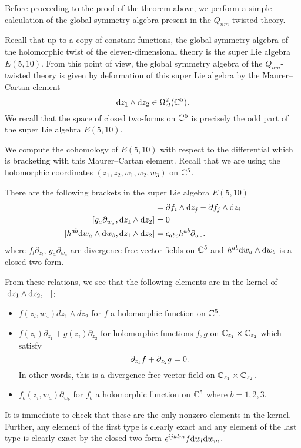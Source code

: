 Before proceeding to the proof of the theorem above, we perform a simple calculation of the global symmetry algebra present in the $Q_{nm}$-twisted theory. 

Recall that up to a copy of constant functions, the global symmetry algebra of the holomorphic twist of the eleven-dimensional theory is the super Lie algebra $E(5,10)$.
From this point of view, the global symmetry algebra of the $Q_{nm}$-twisted theory is given by deformation of this super Lie algebra by the Maurer--Cartan element 
\[
{\rm d} z_1 \wedge {\rm d} z_2 \in \Omega^{2}_{cl}(\mathbb C^5) .
\]
We recall that the space of closed two-forms on $\mathbb C^5$ is precisely the odd part of the super Lie algebra $E(5,10)$. 

We compute the cohomology of $E(5,10)$ with respect to the differential which is bracketing with this Maurer--Cartan element. 
Recall that we are using the holomorphic coordinates $(z_1,z_2,w_1,w_2,w_3)$ on $\mathbb C^5$. 

There are the following brackets in the super Lie algebra $E(5,10)$ 
\begin{align*}
[f_l \partial_{z_l} , \d z_1 \wedge \d z_2] & = \del f_i \wedge \d z_j - \del f_j \wedge \d z_i \\
[g_a \partial_{w_a} , \d z_1 \wedge \d z_2] & = 0 \\
[h^{ab} \d w_a \wedge \d w_b , \d z_1 \wedge \d z_2 ] & = \ep_{abc} h^{ab} \partial_{w_c} .
\end{align*}
where $f_l \partial_{z_l}$, $g_a \partial_{w_a}$ are divergence-free vector fields on $\mathbb C^5$ and $h^{ab} {\rm d} w_a \wedge {\rm d} w_b$ is a closed two-form. 

From these relations, we see that the following elements are in the kernel of $[{\rm d} z_1 \wedge {\rm d} z_2, -]$:
\begin{itemize}
\item $f(z_i, w_a)dz_1\wedge dz_2$ for $f$ a holomorphic function on $\mathbb C^5$.
\item $f(z_i) \partial_{z_1} + g(z_i) \partial_{z_2}$ for holomorphic functions $f,g$ on $\mathbb C_{z_1} \times \mathbb C_{z_2}$ which satisfy 
\[
\partial_{z_1} f + \partial_{z_2} g = 0 .
\]
In other words, this is a divergence-free vector field on $\mathbb C_{z_1} \times \mathbb C_{z_2}$. 
\item $f_b(z_i, w_a) \partial_{w_b}$ for $f_b$ a holomorphic function on $\mathbb C^5$ where $b=1,2,3$. 
\end{itemize}
It is immediate to check that these are the only nonzero elements in the kernel. 
Further, any element of the first type is clearly exact and any element of the last type is clearly exact by the closed two-form $\epsilon^{ijklm} f {\rm d} w_l {\rm d} w_m$. 

